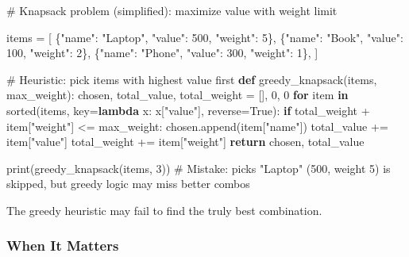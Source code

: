 \documentclass[
  letterpaper,
  DIV=11,
  numbers=noendperiod]{scrreprt}
\newenvironment{Shaded}{\begin{snugshade}}{\end{snugshade}}
\newcommand{\BuiltInTok}[1]{\textcolor[rgb]{0.00,0.23,0.31}{#1}}
\newcommand{\CommentTok}[1]{\textcolor[rgb]{0.37,0.37,0.37}{#1}}
\newcommand{\ControlFlowTok}[1]{\textcolor[rgb]{0.00,0.23,0.31}{\textbf{#1}}}
\newcommand{\DecValTok}[1]{\textcolor[rgb]{0.68,0.00,0.00}{#1}}
\newcommand{\KeywordTok}[1]{\textcolor[rgb]{0.00,0.23,0.31}{\textbf{#1}}}
\newcommand{\NormalTok}[1]{\textcolor[rgb]{0.00,0.23,0.31}{#1}}
\newcommand{\OperatorTok}[1]{\textcolor[rgb]{0.37,0.37,0.37}{#1}}
\newcommand{\StringTok}[1]{\textcolor[rgb]{0.13,0.47,0.30}{#1}}
\newcommand{\VariableTok}[1]{\textcolor[rgb]{0.07,0.07,0.07}{#1}}
\begin{document}
\begin{Shaded}
\begin{Highlighting}[]
\CommentTok{\# Knapsack problem (simplified): maximize value with weight limit}

\NormalTok{items }\OperatorTok{=}\NormalTok{ [}
\NormalTok{    \{}\StringTok{"name"}\NormalTok{: }\StringTok{"Laptop"}\NormalTok{, }\StringTok{"value"}\NormalTok{: }\DecValTok{500}\NormalTok{, }\StringTok{"weight"}\NormalTok{: }\DecValTok{5}\NormalTok{\},}
\NormalTok{    \{}\StringTok{"name"}\NormalTok{: }\StringTok{"Book"}\NormalTok{, }\StringTok{"value"}\NormalTok{: }\DecValTok{100}\NormalTok{, }\StringTok{"weight"}\NormalTok{: }\DecValTok{2}\NormalTok{\},}
\NormalTok{    \{}\StringTok{"name"}\NormalTok{: }\StringTok{"Phone"}\NormalTok{, }\StringTok{"value"}\NormalTok{: }\DecValTok{300}\NormalTok{, }\StringTok{"weight"}\NormalTok{: }\DecValTok{1}\NormalTok{\},}
\NormalTok{]}

\CommentTok{\# Heuristic: pick items with highest value first}
\KeywordTok{def}\NormalTok{ greedy\_knapsack(items, max\_weight):}
\NormalTok{    chosen, total\_value, total\_weight }\OperatorTok{=}\NormalTok{ [], }\DecValTok{0}\NormalTok{, }\DecValTok{0}
    \ControlFlowTok{for}\NormalTok{ item }\KeywordTok{in} \BuiltInTok{sorted}\NormalTok{(items, key}\OperatorTok{=}\KeywordTok{lambda}\NormalTok{ x: x[}\StringTok{"value"}\NormalTok{], reverse}\OperatorTok{=}\VariableTok{True}\NormalTok{):}
        \ControlFlowTok{if}\NormalTok{ total\_weight }\OperatorTok{+}\NormalTok{ item[}\StringTok{"weight"}\NormalTok{] }\OperatorTok{\textless{}=}\NormalTok{ max\_weight:}
\NormalTok{            chosen.append(item[}\StringTok{"name"}\NormalTok{])}
\NormalTok{            total\_value }\OperatorTok{+=}\NormalTok{ item[}\StringTok{"value"}\NormalTok{]}
\NormalTok{            total\_weight }\OperatorTok{+=}\NormalTok{ item[}\StringTok{"weight"}\NormalTok{]}
    \ControlFlowTok{return}\NormalTok{ chosen, total\_value}

\BuiltInTok{print}\NormalTok{(greedy\_knapsack(items, }\DecValTok{3}\NormalTok{))  }
\CommentTok{\# Mistake: picks "Laptop" (500, weight 5) is skipped, but greedy logic may miss better combos}
\end{Highlighting}
\end{Shaded}

The greedy heuristic may fail to find the truly best combination.

\subsubsection{When It Matters}\label{when-it-matters-82}
\end{document}
